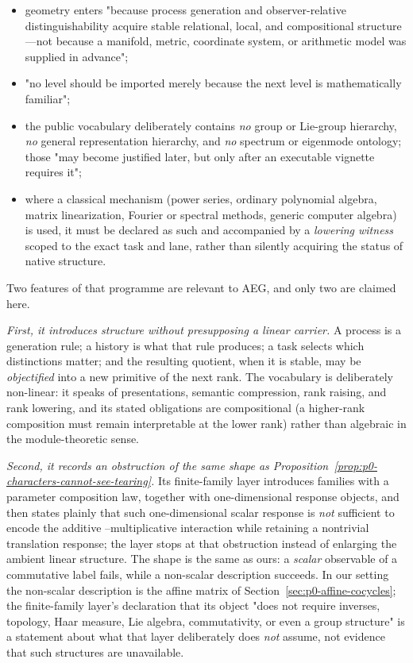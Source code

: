 \begin{itemize}
  \item geometry enters "because process generation and observer-relative
  distinguishability acquire stable relational, local, and compositional
  structure---not because a manifold, metric, coordinate system, or arithmetic
  model was supplied in advance";
  \item "no level should be imported merely because the next level is
  mathematically familiar";
  \item the public vocabulary deliberately contains \emph{no} group or Lie-group
  hierarchy, \emph{no} general representation hierarchy, and \emph{no} spectrum or
  eigenmode ontology; those "may become justified later, but only after an
  executable vignette requires it";
  \item where a classical mechanism (power series, ordinary polynomial algebra,
  matrix linearization, Fourier or spectral methods, generic computer algebra)
  is used, it must be declared as such and accompanied by a \emph{lowering witness}
  scoped to the exact task and lane, rather than silently acquiring the status
  of native structure.
\end{itemize}

Two features of that programme are relevant to AEG, and only two are claimed
here.

\emph{First, it introduces structure without presupposing a linear carrier.}  A
process is a generation rule; a history is what that rule produces; a task
selects which distinctions matter; and the resulting quotient, when it is
stable, may be \emph{objectified} into a new primitive of the next rank.  The
vocabulary is deliberately non-linear: it speaks of presentations, semantic
compression, rank raising, and rank lowering, and its stated obligations are
compositional (a higher-rank composition must remain interpretable at the lower
rank) rather than algebraic in the module-theoretic sense.

\emph{Second, it records an obstruction of the same shape as
Proposition~\ref{prop:p0-characters-cannot-see-tearing}.}  Its finite-family
layer introduces families with a parameter composition law, together with
one-dimensional response objects, and then states plainly that such
one-dimensional scalar response is \emph{not} sufficient to encode the additive
--multiplicative interaction while retaining a nontrivial translation response;
the layer stops at that obstruction instead of enlarging the ambient linear
structure.  The shape is the same as ours: a \emph{scalar} observable of a
commutative label fails, while a non-scalar description succeeds.  In our
setting the non-scalar description is the affine matrix of
Section~\ref{sec:p0-affine-cocycles}; the finite-family layer's declaration
that its object "does not require inverses, topology, Haar measure, Lie algebra,
commutativity, or even a group structure" is a statement about what that layer
deliberately does \emph{not} assume, not evidence that such structures are
unavailable.

